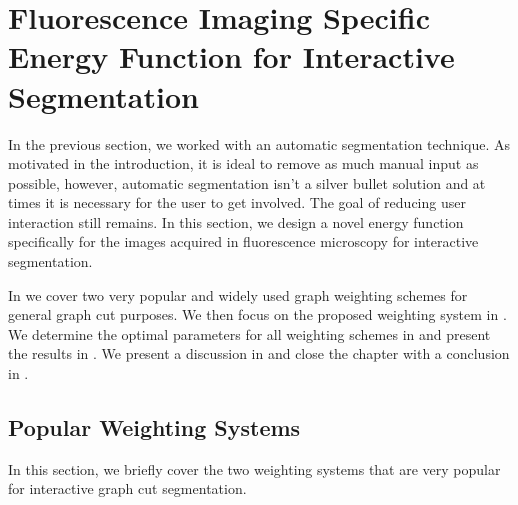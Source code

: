 
\chapter{Fluorescence Imaging Specific Energy Function for Interactive Segmentation} %

\label{chap:Chapter6} %


In the previous section, we worked with an automatic segmentation technique. As motivated in the introduction, it is ideal to remove as much manual input as possible, however, automatic segmentation isn't a silver bullet solution and at times it is necessary for the user to get involved. The goal of reducing user interaction still remains. In this section, we design a novel energy function specifically for the images acquired in fluorescence microscopy for interactive segmentation.

In  we cover two very popular and widely used graph weighting schemes for general graph cut purposes. We then focus on the proposed weighting system in . We determine the optimal parameters for all weighting schemes in  and present the results in . We present a discussion in  and close the chapter with a conclusion in .


\section{Popular Weighting Systems}
\label{sec:interactivepopularweighting}

In this section, we briefly cover the two weighting systems that are very popular for interactive graph cut segmentation.

